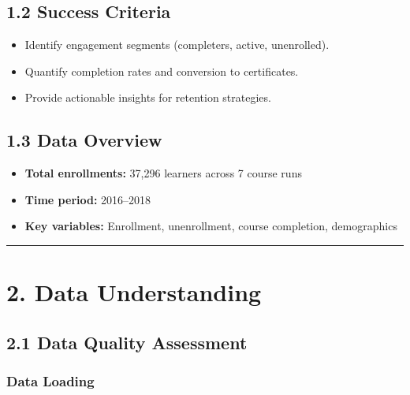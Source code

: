 \documentclass[
]{article}
\providecommand{\tightlist}{%
  \setlength{\itemsep}{0pt}\setlength{\parskip}{0pt}}
\begin{document}
\subsection{1.2 Success Criteria}\label{success-criteria}

\begin{itemize}
\tightlist
\item
  Identify engagement segments (completers, active, unenrolled).\\
\item
  Quantify completion rates and conversion to certificates.\\
\item
  Provide actionable insights for retention strategies.
\end{itemize}

\subsection{1.3 Data Overview}\label{data-overview}

\begin{itemize}
\tightlist
\item
  \textbf{Total enrollments:} 37,296 learners across 7 course runs\\
\item
  \textbf{Time period:} 2016--2018\\
\item
  \textbf{Key variables:} Enrollment, unenrollment, course completion,
  demographics
\end{itemize}

\begin{center}\rule{0.5\linewidth}{0.5pt}\end{center}

\section{2. Data Understanding}\label{data-understanding}

\subsection{2.1 Data Quality Assessment}\label{data-quality-assessment}

\subsubsection{Data Loading}\label{data-loading}
\end{document}
